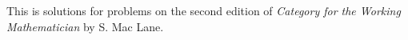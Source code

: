 \documentclass{article}
\begin{document}
This is solutions for problems on the second edition of \textit{Category for the Working Mathematician} by S. Mac Lane.

\section{}

\subsection{}

\subsection{}

\subsection{}

\subsubsection{}



\subsubsection{}



\subsubsection{}



\subsubsection{}



\subsubsection{}



\subsection{}

\subsubsection{}
\end{document}
